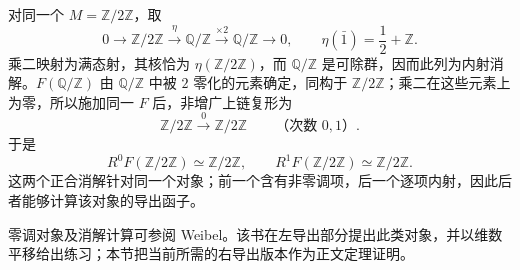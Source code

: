 对同一个 \(M=\mathbb Z/2\mathbb Z\)，取
\[
	0\longrightarrow\mathbb Z/2\mathbb Z\xrightarrow{\eta}\mathbb Q/\mathbb Z \xrightarrow{\times2}\mathbb Q/\mathbb Z\longrightarrow0, \qquad \eta(\bar1)=\dfrac12+\mathbb Z.
\]
乘二映射为满态射，其核恰为 \(\eta(\mathbb Z/2\mathbb Z)\)，而 \(\mathbb Q/\mathbb Z\) 是可除群，因而此列为内射消解。\(F(\mathbb Q/\mathbb Z)\) 由 \(\mathbb Q/\mathbb Z\) 中被 \(2\) 零化的元素确定，同构于 \(\mathbb Z/2\mathbb Z\)；乘二在这些元素上为零，所以施加同一 \(F\) 后，非增广上链复形为
\[
	\mathbb Z/2\mathbb Z\xrightarrow{0}\mathbb Z/2\mathbb Z \qquad\text{（次数 }0,1\text{）}.
\]
于是
\[
	R^0F(\mathbb Z/2\mathbb Z)\simeq\mathbb Z/2\mathbb Z, \qquad R^1F(\mathbb Z/2\mathbb Z)\simeq\mathbb Z/2\mathbb Z.
\]
这两个正合消解针对同一个对象；前一个含有非零调项，后一个逐项内射，因此后者能够计算该对象的导出函子。

\ProseParagraphBreak
零调对象及消解计算可参阅 Weibel\cite[F-Acyclic Objects 2.4.3, Exercise 2.4.3, Section 2.5]{Weibel1994HomologicalAlgebra}。该书在左导出部分提出此类对象，并以维数平移给出练习；本节把当前所需的右导出版本作为正文定理证明。
